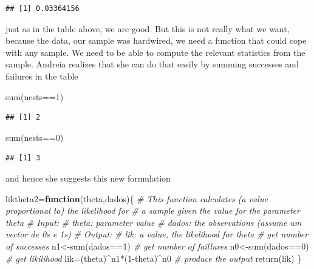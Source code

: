 \documentclass[
]{book}
\newenvironment{Shaded}{\begin{snugshade}}{\end{snugshade}}
\newcommand{\CommentTok}[1]{\textcolor[rgb]{0.56,0.35,0.01}{\textit{#1}}}
\newcommand{\ControlFlowTok}[1]{\textcolor[rgb]{0.13,0.29,0.53}{\textbf{#1}}}
\newcommand{\DecValTok}[1]{\textcolor[rgb]{0.00,0.00,0.81}{#1}}
\newcommand{\FunctionTok}[1]{\textcolor[rgb]{0.00,0.00,0.00}{#1}}
\newcommand{\NormalTok}[1]{#1}
\newcommand{\OtherTok}[1]{\textcolor[rgb]{0.56,0.35,0.01}{#1}}
\newcommand{\SpecialCharTok}[1]{\textcolor[rgb]{0.00,0.00,0.00}{#1}}
\begin{document}
\begin{verbatim}
## [1] 0.03364156
\end{verbatim}

just as in the table above, we are good. But this is not really what we want, because the data, our sample was hardwired, we need a function that could cope with any sample. We need to be able to compute the relevant statistics from the sample. Andreia realizes that she can do that easily by summing successes and failures in the table

\begin{Shaded}
\begin{Highlighting}[]
\FunctionTok{sum}\NormalTok{(nests}\SpecialCharTok{==}\DecValTok{1}\NormalTok{)}
\end{Highlighting}
\end{Shaded}

\begin{verbatim}
## [1] 2
\end{verbatim}

\begin{Shaded}
\begin{Highlighting}[]
\FunctionTok{sum}\NormalTok{(nests}\SpecialCharTok{==}\DecValTok{0}\NormalTok{)}
\end{Highlighting}
\end{Shaded}

\begin{verbatim}
## [1] 3
\end{verbatim}

and hence she suggests this new formulation

\begin{Shaded}
\begin{Highlighting}[]
\NormalTok{liktheta2}\OtherTok{=}\ControlFlowTok{function}\NormalTok{(theta,dados)\{}
  \CommentTok{\# This function calculates (a value proportional to) the likelihood for }
  \CommentTok{\# a sample given the value for the parameter theta }
  \CommentTok{\# Input:}
  \CommentTok{\#       theta: parameter value}
  \CommentTok{\#       dados: the observations (assume um vector de 0\textquotesingle{}s e 1\textquotesingle{}s)}
  \CommentTok{\# Output:}
  \CommentTok{\#       lik: a value, the likelihood for theta}
  \CommentTok{\# get number of successes}
\NormalTok{  n1}\OtherTok{\textless{}{-}}\FunctionTok{sum}\NormalTok{(dados}\SpecialCharTok{==}\DecValTok{1}\NormalTok{)}
  \CommentTok{\# get number of faillures}
\NormalTok{  n0}\OtherTok{\textless{}{-}}\FunctionTok{sum}\NormalTok{(dados}\SpecialCharTok{==}\DecValTok{0}\NormalTok{)}
  \CommentTok{\# get likilihood}
\NormalTok{  lik}\OtherTok{=}\NormalTok{(theta)}\SpecialCharTok{\^{}}\NormalTok{n1}\SpecialCharTok{*}\NormalTok{(}\DecValTok{1}\SpecialCharTok{{-}}\NormalTok{theta)}\SpecialCharTok{\^{}}\NormalTok{n0}
  \CommentTok{\# produce the output}
  \FunctionTok{return}\NormalTok{(lik)}
\NormalTok{  \}}
\end{Highlighting}
\end{Shaded}
\end{document}
